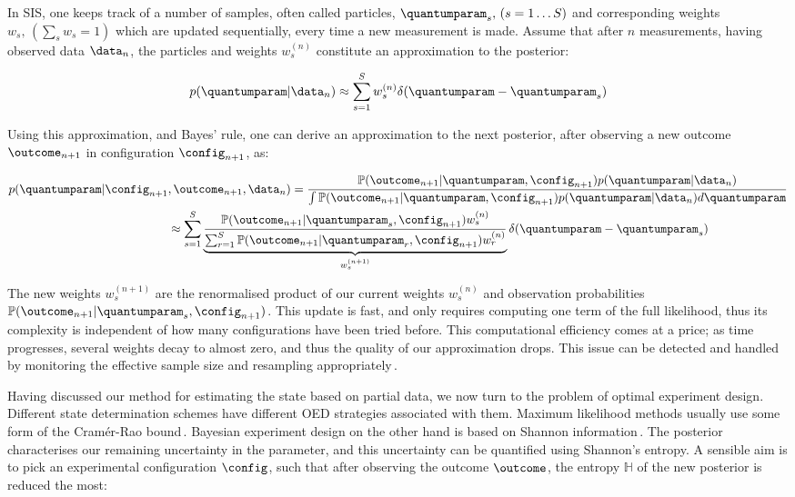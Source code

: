 In SIS, one keeps track of a number of samples, often called particles, $\quantumparam_s,\, (s=1\ldots S)$ and corresponding weights $w_s, \, \left( \sum_s w_s = 1 \right)$  which are updated sequentially, every time a new measurement is made. Assume that after $n$ measurements, having observed data $\data_n$, the particles and weights  $w^{(n)}_s$ constitute an approximation to the posterior:

\begin{equation}
	p(\quantumparam\vert\data_n)\approx \sum_{s=1}^{S}w^{(n)}_s\delta(\quantumparam-\quantumparam_s)\label{eqn:SISapprox}
\end{equation}

Using this approximation, and Bayes' rule, one can derive an approximation to the next posterior, after observing a new outcome $\outcome_{n+1}$ in configuration $\config_{n+1}$, as:

\begin{align}
	p(\quantumparam\vert\config_{n+1}&,\outcome_{n+1},\data_n) = \frac{\mathbb{P}(\outcome_{n+1}\vert\quantumparam,\config_{n+1})p(\quantumparam\vert\data_n)}{\int \mathbb{P}(\outcome_{n+1}\vert\quantumparam,\config_{n+1})p(\quantumparam\vert\data_n) d\quantumparam}\label{eqn:SISupdate}\\
	&\approx \sum_{s=1}^{S}\underbrace{\frac{\mathbb{P}(\outcome_{n+1}\vert\quantumparam_s,\config_{n+1})w^{(n)}_s}{\sum_{r=1}^{S}\mathbb{P}(\outcome_{n+1}\vert\quantumparam_r,\config_{n+1})w^{(n)}_r}}_{w^{(n+1)}_s}\delta(\quantumparam-\quantumparam_s)\notag
\end{align}

The new weights $w^{(n+1)}_s$ are the renormalised product of our current weights $w^{(n)}_s$ and observation probabilities $\mathbb{P}(\outcome_{n+1}\vert\quantumparam_s,\config_{n+1})$. This update is fast, and only requires computing one term of the full likelihood, thus its complexity is independent of how many configurations have been tried before. This computational efficiency comes at a price; as time progresses, several weights decay to almost zero, and thus the quality of our approximation drops. This issue can be detected and handled by monitoring the effective sample size and resampling appropriately\,\cite{SMCBook}.

Having discussed our method for estimating the state based on partial data, we now turn to the problem of optimal experiment design. Different state determination schemes have different OED strategies associated with them. Maximum likelihood methods usually use some form of the Cram\'{e}r-Rao bound\,\cite{OEDFirst,OEDAverage}. Bayesian experiment design on the other hand is based on Shannon information\,\cite{MUBFirst,ExactInformation}. The posterior characterises our remaining uncertainty in the parameter, and this uncertainty can be quantified using Shannon's entropy. A sensible aim is to pick an experimental configuration $\config$, such that after observing the outcome $\outcome$, the entropy $\mathbb{H}$ of the new posterior is reduced the most:

